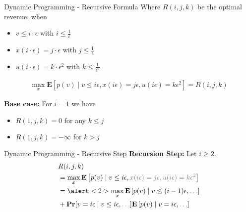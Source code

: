 \documentclass{beamer}
\begin{document}
\begin{frame}{Dynamic Programming - Recursive Formula}
  Where $R(i,j,k)$ be the optimal revenue, when
  \begin{itemize}
    \item $v \leq i \cdot \epsilon$ with $i \leq \frac{1}{\epsilon}$
    \item $x(i \cdot \epsilon) = j \cdot \epsilon$ with $j \leq \frac{1}{\epsilon}$
    \item $u(i \cdot \epsilon) = k \cdot \epsilon^2$ with $k \leq \frac{1}{\epsilon^2}$
  \end{itemize}
  \begin{align*}
    \max_x \mathbf{E}[p(v) \mid v \leq i \epsilon, x(i\epsilon) = j\epsilon, u(i\epsilon) = k\epsilon^2] = R(i,j,k)
  \end{align*}

  \textbf{Base case:}
  For $i = 1$ we have
  \begin{itemize}
    \item $R(1,j,k) = 0$ for any $k \leq j$
    \item $R(1,j,k) = -\infty$ for $k > j$
  \end{itemize}
\end{frame}

\begin{frame}{Dynamic Programming - Recursive Step}
  \textbf{Recursion Step:}
  Let $i \geq 2$.
  \begin{align*}
     & R(i,j,k)                                                                                                                                               \\
     & = \max_x \mathbf{E}\left[p(v) \mid v \leq i \epsilon, \mathcolor{gray}{x(i\epsilon) = j\epsilon, u(i\epsilon) = k\epsilon^2}\right]                    \\
     & = \alert<2>{\max_x \mathbf{E}\left[p(v) \mid v \leq (i - 1) \epsilon, \mathcolor{gray}{\dots} \right]}                                                 \\
     & + \mathbf{Pr}[v = i\epsilon \mid v \leq i \epsilon, \mathcolor{gray}{\dots} ] \mathbf{E}\left[p(v) \mid v = i\epsilon, \mathcolor{gray}{\dots} \right]
  \end{align*}
\end{frame}
\end{document}
